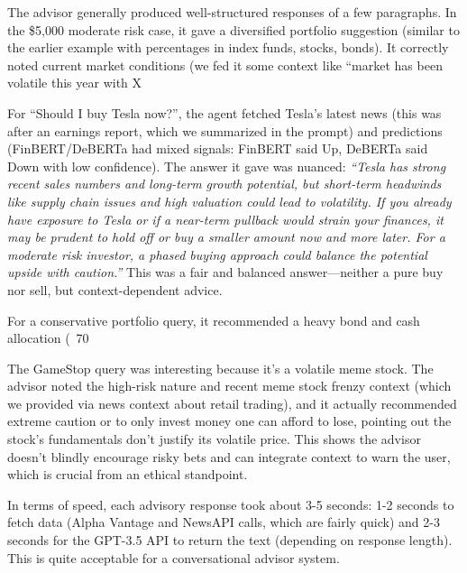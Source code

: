 \documentclass{scrartcl}
\begin{document}
The advisor generally produced well-structured responses of a few paragraphs. In the \$5,000 moderate risk case, it gave a diversified portfolio suggestion (similar to the earlier example with percentages in index funds, stocks, bonds). It correctly noted current market conditions (we fed it some context like “market has been volatile this year with X%

For “Should I buy Tesla now?”, the agent fetched Tesla’s latest news (this was after an earnings report, which we summarized in the prompt) and predictions (FinBERT/DeBERTa had mixed signals: FinBERT said Up, DeBERTa said Down with low confidence). The answer it gave was nuanced: \textit{“Tesla has strong recent sales numbers and long-term growth potential, but short-term headwinds like supply chain issues and high valuation could lead to volatility. If you already have exposure to Tesla or if a near-term pullback would strain your finances, it may be prudent to hold off or buy a smaller amount now and more later. For a moderate risk investor, a phased buying approach could balance the potential upside with caution.”} This was a fair and balanced answer—neither a pure buy nor sell, but context-dependent advice.

For a conservative portfolio query, it recommended a heavy bond and cash allocation (~70%

The GameStop query was interesting because it’s a volatile meme stock. The advisor noted the high-risk nature and recent meme stock frenzy context (which we provided via news context about retail trading), and it actually recommended extreme caution or to only invest money one can afford to lose, pointing out the stock’s fundamentals don’t justify its volatile price. This shows the advisor doesn’t blindly encourage risky bets and can integrate context to warn the user, which is crucial from an ethical standpoint.

In terms of speed, each advisory response took about 3-5 seconds: 1-2 seconds to fetch data (Alpha Vantage and NewsAPI calls, which are fairly quick) and 2-3 seconds for the GPT-3.5 API to return the text (depending on response length). This is quite acceptable for a conversational advisor system.
\end{document}
